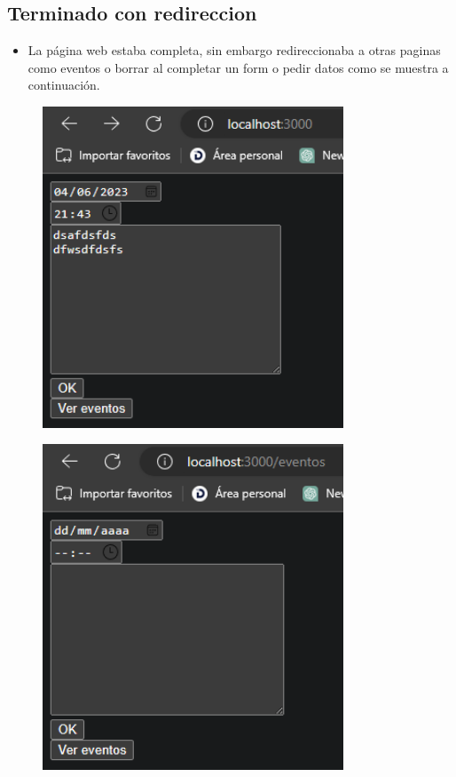 \documentclass{article}
\begin{document}
	\subsection{Terminado con redireccion}
	\begin{itemize}	
		\item La página web estaba completa, sin embargo redireccionaba a otras paginas como eventos
		o borrar al completar un form o pedir datos como se muestra a continuación.
	\end{itemize}
	\begin{figure}[H]
		\centering
		\includegraphics[width=0.8\textwidth,keepaspectratio]{img/localhost02.png}
	\end{figure}
	\begin{figure}[H]
		\centering
		\includegraphics[width=0.8\textwidth,keepaspectratio]{img/l-eventos.png}
	\end{figure}
\end{document}
